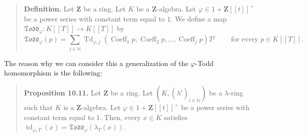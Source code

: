 \documentclass[numbers=enddot,12pt,final,onecolumn,notitlepage]{scrartcl}%
\begin{document}
\begin{quote}
\textbf{Definition.} Let $\mathbf{Z}$ be a ring. Let $K$ be a $\mathbf{Z}%
$-algebra. Let $\varphi\in1+\mathbf{Z}\left[  \left[  t\right]  \right]  ^{+}$
be a power series with constant term equal to $1$. We define a map
$\mathfrak{Todd}_{\varphi}:K\left[  \left[  T\right]  \right]  \rightarrow
K\left[  \left[  T\right]  \right]  $ by
\begin{equation}
\mathfrak{Todd}_{\varphi}\left(  p\right)  =\sum\limits_{j\in\mathbb{N}%
}\operatorname*{Td}\nolimits_{\varphi,j}\left(  \operatorname*{Coeff}%
\nolimits_{1}p,\operatorname*{Coeff}\nolimits_{2}p,...,\operatorname*{Coeff}%
\nolimits_{j}p\right)  T^{j}\ \ \ \ \ \ \ \ \ \ \text{for every }p\in K\left[
\left[  T\right]  \right]  . \label{ToddFrak}%
\end{equation}



\end{quote}

The reason why we can consider this a generalization of the $\varphi$-Todd
homomorphism is the following:

\begin{quote}
\textbf{Proposition 10.11.} Let $\mathbf{Z}$ be a ring. Let $\left(  K,\left(
\lambda^{i}\right)  _{i\in\mathbb{N}}\right)  $ be a $\lambda$-ring such that
$K$ is a $\mathbf{Z}$-algebra. Let $\varphi\in1+\mathbf{Z}\left[  \left[
t\right]  \right]  ^{+}$ be a power series with constant term equal to $1$.
Then, every $x\in K$ satisfies $\operatorname*{td}_{\varphi,T}\left(
x\right)  =\mathfrak{Todd}_{\varphi}\left(  \lambda_{T}\left(  x\right)
\right)  $.
\end{quote}
\end{document}
